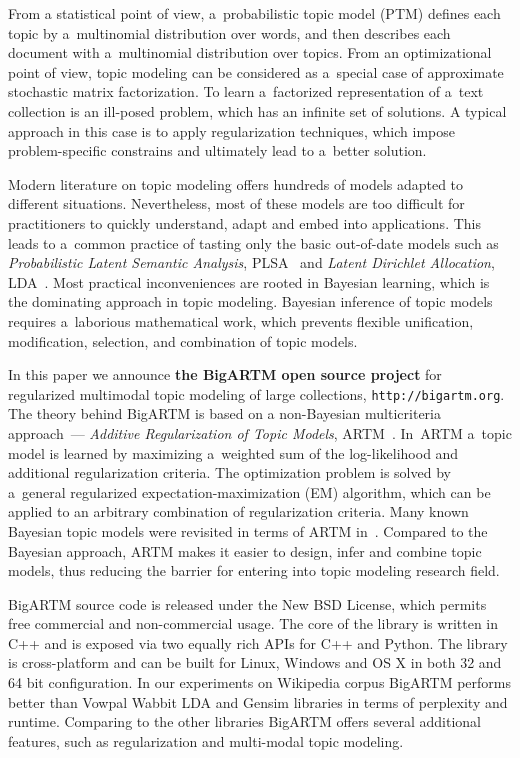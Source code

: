 \documentclass[russian,english]{llncs}
\begin{document}
From a statistical point of view, a~probabilistic topic model (PTM)
defines each topic by a~multinomial distribution over words,
and then describes each document with a~multinomial distribution over topics.
From an optimizational point of view,
topic modeling can be considered as a~special case
of approximate stochastic matrix factorization.
To learn a~factorized representation of a~text collection
is an ill-posed problem, which has an infinite set of solutions.
A typical approach in this case is to apply regularization techniques,
which impose problem-specific constrains
and ultimately lead to a~better solution.

Modern literature on topic modeling offers hundreds of models adapted to different situations.
Nevertheless,
most of these models are too difficult for practitioners
to quickly understand, adapt and embed into applications.
This leads to a~common practice of tasting only the basic out-of-date models such as
\emph{Probabilistic Latent Semantic Analysis}, PLSA~\cite{hofmann99plsi} and
\emph{Latent Dirichlet Allocation}, LDA~\cite{blei03latent}.
Most practical inconveniences are rooted in Bayesian learning,
which is the dominating approach in topic modeling.
Bayesian inference of topic models requires a~laborious mathematical work,
which prevents flexible unification, modification, selection, and combination of topic models.

In this paper we announce \textbf{the BigARTM open source project} for
regularized multimodal topic modeling of large collections,
\texttt{http://bigartm.org}.
The theory behind BigARTM is based on a non-Bayesian multicriteria approach~---
\emph{Additive Regularization of Topic Models}, ARTM~\cite{voron14dan-eng}.
In~ARTM a~topic model is learned by maximizing a~weighted sum
of the log-likelihood and additional regularization criteria.
The optimization problem is solved by a~general regularized expectation-maximization (EM) algorithm,
which can be applied to an arbitrary combination of regularization criteria.
Many known Bayesian topic models were revisited in terms of ARTM in~\cite{voron14mlj,voron14aist}.
Compared to the Bayesian approach,
ARTM makes it easier to design, infer and combine topic models,
thus reducing the barrier for entering into topic modeling research field.

BigARTM source code is released under the New BSD License, which permits free commercial and non-commercial usage.
The core of the library is written in C++ and is exposed via two equally rich APIs for C++ and Python.
The library is cross-platform and can be built for Linux, Windows and OS X in both 32 and 64 bit configuration.
In our experiments on Wikipedia corpus BigARTM performs better than Vowpal Wabbit LDA and Gensim libraries
in terms of perplexity and runtime.
Comparing to the other libraries BigARTM offers several additional features,
such as regularization and multi-modal topic modeling.
\end{document}
